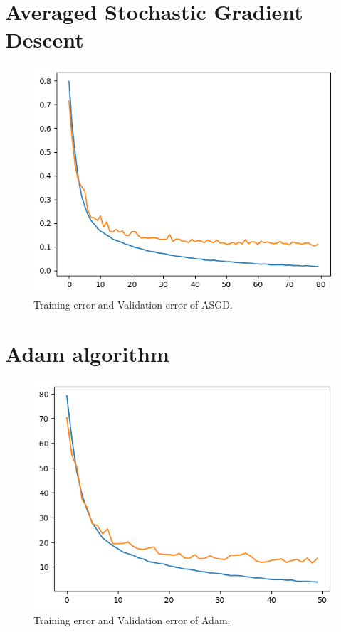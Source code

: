 \section{Averaged Stochastic Gradient Descent}

\begin{figure}[h]
    \centering %
        \includegraphics[width=0.8\linewidth]{./ASGD.png} 
    \caption{Training error and Validation error of ASGD.}
    \label{figure:sample figure} %
\end{figure}

\section{Adam algorithm}

\begin{figure}[h]
    \centering %
        \includegraphics[width=0.8\linewidth]{./ADAM.png} 
    \caption{Training error and Validation error of Adam.}
    \label{figure:sample figure} %
\end{figure}

